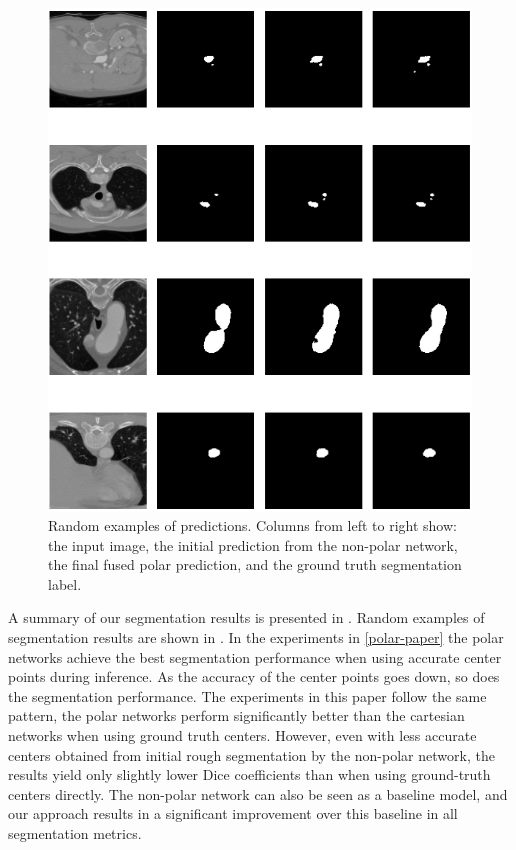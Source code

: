 \begin{figure}[h!]
\centering
\includegraphics[width=\columnwidth]{images/4/examples_3}
\caption{Random examples of predictions. Columns from left to right show: the input image, the initial prediction from the non-polar network, the final fused polar prediction, and the ground truth segmentation label. \cite{bencevicUsingPolarTransform2022a}}
\label{fig:examples}
\end{figure}

\pagebreak

A summary of our segmentation results is presented in . Random examples of segmentation results are shown in . In the experiments in \ref{polar-paper} the polar networks achieve the best segmentation performance when using accurate center points during inference. As the accuracy of the center points goes down, so does the segmentation performance. The experiments in this paper follow the same pattern, the polar networks perform significantly better than the cartesian networks when using ground truth centers. However, even with less accurate centers obtained from initial rough segmentation by the non-polar network, the results yield only slightly lower Dice coefficients than when using ground-truth centers directly. The non-polar network can also be seen as a baseline model, and our approach results in a significant improvement over this baseline in all segmentation metrics.

